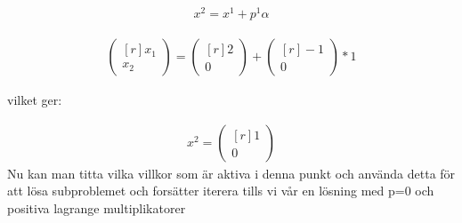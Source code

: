 \begin{equation*}
\begin{aligned}
x^2=x^1+p^1\alpha
\end{aligned}
\end{equation*}

\begin{equation*}
\begin{aligned}
  \begin{pmatrix*}[r]
   x_1  \\
   x_2
\end{pmatrix*}=
  \begin{pmatrix*}[r]
   2  \\
   0
\end{pmatrix*}+
  \begin{pmatrix*}[r]
   -1  \\
   0
\end{pmatrix*}*1
\end{aligned}
\end{equation*}

vilket ger:

\begin{equation*}
\begin{aligned}
x^2=
  \begin{pmatrix*}[r]
   1  \\
   0
\end{pmatrix*}
\end{aligned}
\end{equation*}
Nu kan man titta vilka villkor som är aktiva i denna punkt och använda detta för att lösa subproblemet och forsätter iterera tills vi vår en lösning med p=0 och positiva lagrange multiplikatorer